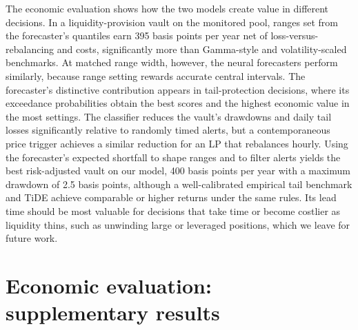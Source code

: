 The economic evaluation shows how the two models create value in different decisions. In a
liquidity-provision vault on the monitored pool, ranges set from the forecaster's quantiles
earn 395 basis points per year net of loss-versus-rebalancing and costs, significantly more
than Gamma-style and volatility-scaled benchmarks. At matched range width, however, the neural
forecasters perform similarly, because range setting rewards accurate central intervals. The
forecaster's distinctive contribution appears in tail-protection decisions, where its
exceedance probabilities obtain the best scores and the highest economic value in the most
settings. The classifier reduces the vault's drawdowns and daily tail losses significantly
relative to randomly timed alerts, but a contemporaneous price trigger achieves a similar
reduction for an LP that rebalances hourly. Using the forecaster's expected shortfall to shape
ranges and to filter alerts yields the best risk-adjusted vault on our model, 400 basis points
per year with a maximum drawdown of 2.5 basis points, although a well-calibrated empirical
tail benchmark and TiDE achieve comparable or higher returns under the same rules. Its lead time should be most valuable for decisions
that take time or become costlier as liquidity thins, such as unwinding large or leveraged
positions, which we leave for future work.


\section{Economic evaluation: supplementary results}\label{sec:econ_appendix}

